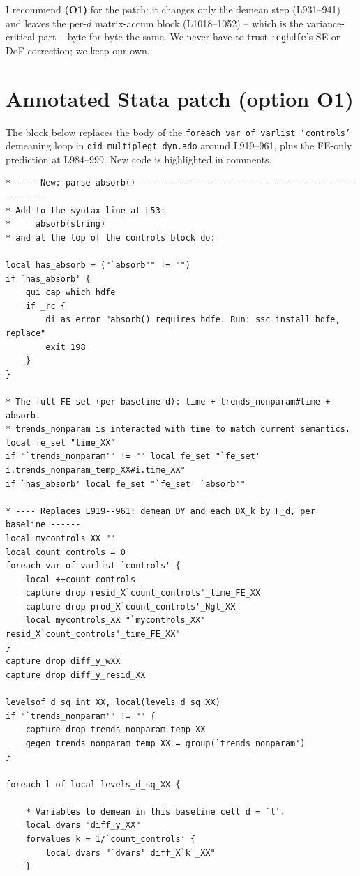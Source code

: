 \documentclass[11pt]{article}
\newcommand{\code}[1]{\texttt{\small #1}}
\newcommand{\1}{\mathbb{1}}
\begin{document}
\noindent
I recommend \textbf{(O1)} for the patch: it changes only the demean step
(L931--941) and leaves the per-$d$ matrix-accum block (L1018--1052) -- which
is the variance-critical part -- byte-for-byte the same. We never have to
trust \texttt{reghdfe}'s SE or DoF correction; we keep our own.

\section{Annotated Stata patch (option O1)}

The block below replaces the body of the
\code{foreach var of varlist `controls'} demeaning loop in
\texttt{did\_multiplegt\_dyn.ado} around L919--961, plus the FE-only
prediction at L984--999. New code is highlighted in comments.

\begin{lstlisting}
* ---- New: parse absorb() ---------------------------------------------------
* Add to the syntax line at L53:
*     absorb(string)
* and at the top of the controls block do:

local has_absorb = ("`absorb'" != "")
if `has_absorb' {
    qui cap which hdfe
    if _rc {
        di as error "absorb() requires hdfe. Run: ssc install hdfe, replace"
        exit 198
    }
}

* The full FE set (per baseline d): time + trends_nonparam#time + absorb.
* trends_nonparam is interacted with time to match current semantics.
local fe_set "time_XX"
if "`trends_nonparam'" != "" local fe_set "`fe_set' i.trends_nonparam_temp_XX#i.time_XX"
if `has_absorb' local fe_set "`fe_set' `absorb'"

* ---- Replaces L919--961: demean DY and each DX_k by F_d, per baseline ------
local mycontrols_XX ""
local count_controls = 0
foreach var of varlist `controls' {
    local ++count_controls
    capture drop resid_X`count_controls'_time_FE_XX
    capture drop prod_X`count_controls'_Ngt_XX
    local mycontrols_XX "`mycontrols_XX' resid_X`count_controls'_time_FE_XX"
}
capture drop diff_y_wXX
capture drop diff_y_resid_XX

levelsof d_sq_int_XX, local(levels_d_sq_XX)
if "`trends_nonparam'" != "" {
    capture drop trends_nonparam_temp_XX
    gegen trends_nonparam_temp_XX = group(`trends_nonparam')
}

foreach l of local levels_d_sq_XX {

    * Variables to demean in this baseline cell d = `l'.
    local dvars "diff_y_XX"
    forvalues k = 1/`count_controls' {
        local dvars "`dvars' diff_X`k'_XX"
    }


\end{lstlisting}
\end{document}
